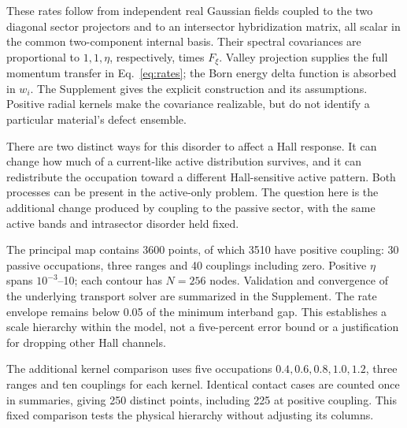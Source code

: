 These rates follow from independent real Gaussian fields coupled to the two diagonal sector projectors and to an intersector hybridization matrix, all scalar in the common two-component internal basis. Their spectral covariances are proportional to $1,1,\eta$, respectively, times $F_\xi$. Valley projection supplies the full momentum transfer in Eq.~\eqref{eq:rates}; the Born energy delta function is absorbed in $w_i$. The Supplement gives the explicit construction and its assumptions. Positive radial kernels make the covariance realizable, but do not identify a particular material's defect ensemble.

There are two distinct ways for this disorder to affect a Hall response. It can change how much of a current-like active distribution survives, and it can redistribute the occupation toward a different Hall-sensitive active pattern. Both processes can be present in the active-only problem. The question here is the additional change produced by coupling to the passive sector, with the same active bands and intrasector disorder held fixed.

The principal map contains 3600 points, of which 3510 have positive coupling: 30 passive occupations, three ranges and 40 couplings including zero. Positive $\eta$ spans $10^{-3}$--10; each contour has $N=256$ nodes. Validation and convergence of the underlying transport solver are summarized in the Supplement. The rate envelope remains below 0.05 of the minimum interband gap. This establishes a scale hierarchy within the model, not a five-percent error bound or a justification for dropping other Hall channels.

The additional kernel comparison uses five occupations $0.4,0.6,0.8,1.0,1.2$, three ranges and ten couplings for each kernel. Identical contact cases are counted once in summaries, giving 250 distinct points, including 225 at positive coupling. This fixed comparison tests the physical hierarchy without adjusting its columns.

